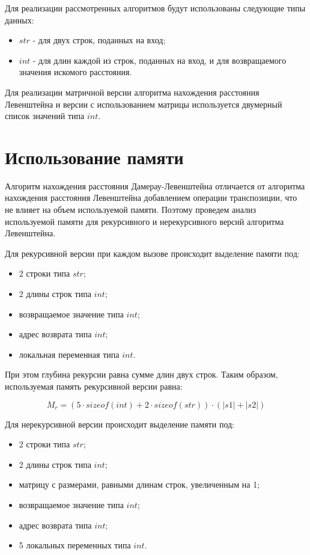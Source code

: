 Для реализации рассмотренных алгоритмов будут использованы следующие типы данных:

\begin{itemize}
	\item $str$ - для двух строк, поданных на вход;
	\item $int$ - для длин каждой из строк, поданных на вход, и для возвращаемого значения искомого расстояния.
\end{itemize}

Для реализации матричной версии алгоритма нахождения расстояния Левенштейна и версии с использованием матрицы используется двумерный список значений типа $int$.

\section{Использование памяти}

Алгоритм нахождения расстояния Дамерау-Левенштейна отличается от алгоритма нахождения расстояния Левенштейна добавлением операции транспозиции, что не влияет на объем используемой памяти. Поэтому проведем анализ используемой памяти для рекурсивного и нерекурсивного версий алгоритма Левенштейна.

Для рекурсивной версии при каждом вызове происходит выделение памяти под:

\begin{itemize}
	\item 2 строки типа $str$;
	\item 2 длины строк типа $int$;
	\item возвращаемое значение типа $int$;
	\item адрес возврата типа $int$;
	\item локальная переменная типа $int$.
\end{itemize}

При этом глубина рекурсии равна сумме длин двух строк. Таким образом, используемая память рекурсивной версии равна:

\begin{equation}
	\label{eq:rm}
	M_{r} = (5 \cdot sizeof(int)+2 \cdot sizeof(str))\cdot(|s1|+|s2|)
\end{equation}

Для нерекурсивной версии происходит выделение памяти под:

\begin{itemize}
	\item 2 строки типа $str$;
	\item 2 длины строк типа $int$;
	\item матрицу с размерами, равными длинам строк, увеличенным на 1;
	\item возвращаемое значение типа $int$;
	\item адрес возврата типа $int$;
	\item 5 локальных переменных типа $int$.
\end{itemize}

